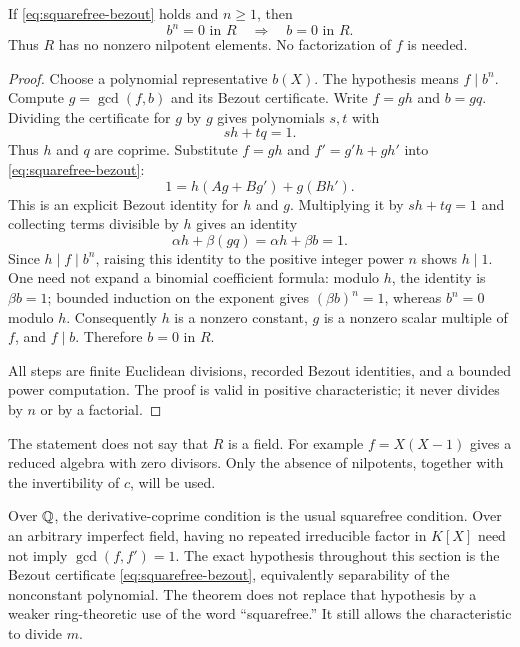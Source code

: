 \begin{lemma}\label{lem:reduced-algebra}
If \eqref{eq:squarefree-bezout} holds and $n\ge1$, then
\[
 b^n=0\text{ in }R\quad\Longrightarrow\quad b=0\text{ in }R.
\]
Thus $R$ has no nonzero nilpotent elements. No factorization of $f$ is needed.
\end{lemma}
\begin{proof}
Choose a polynomial representative $b(X)$. The hypothesis means $f\mid b^n$. Compute $g=\gcd(f,b)$ and its Bezout certificate. Write $f=gh$ and $b=gq$. Dividing the certificate for $g$ by $g$ gives polynomials $s,t$ with
\[
 sh+tq=1.
\]
Thus $h$ and $q$ are coprime. Substitute $f=gh$ and $f'=g'h+gh'$ into \eqref{eq:squarefree-bezout}:
\[
 1=h(Ag+Bg')+g(Bh').
\]
This is an explicit Bezout identity for $h$ and $g$. Multiplying it by $sh+tq=1$ and collecting terms divisible by $h$ gives an identity
\[
 \alpha h+\beta(gq)=\alpha h+\beta b=1.
\]
Since $h\mid f\mid b^n$, raising this identity to the positive integer power $n$ shows $h\mid1$. One need not expand a binomial coefficient formula: modulo $h$, the identity is $\beta b=1$; bounded induction on the exponent gives $(\beta b)^n=1$, whereas $b^n=0$ modulo $h$. Consequently $h$ is a nonzero constant, $g$ is a nonzero scalar multiple of $f$, and $f\mid b$. Therefore $b=0$ in $R$.

All steps are finite Euclidean divisions, recorded Bezout identities, and a bounded power computation. The proof is valid in positive characteristic; it never divides by $n$ or by a factorial.
\end{proof}

The statement does not say that $R$ is a field. For example $f=X(X-1)$ gives a reduced algebra with zero divisors. Only the absence of nilpotents, together with the invertibility of $c$, will be used.

\begin{remark}
Over $\mathbb Q$, the derivative-coprime condition is the usual squarefree condition. Over an arbitrary imperfect field, having no repeated irreducible factor in $K[X]$ need not imply $\gcd(f,f')=1$. The exact hypothesis throughout this section is the Bezout certificate \eqref{eq:squarefree-bezout}, equivalently separability of the nonconstant polynomial. The theorem does not replace that hypothesis by a weaker ring-theoretic use of the word ``squarefree.'' It still allows the characteristic to divide $m$.
\end{remark}

